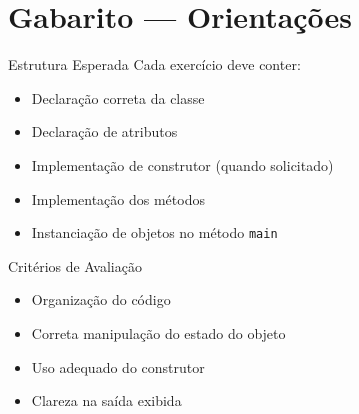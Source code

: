 \documentclass[12pt]{article}
\begin{document}

\section*{Gabarito — Orientações}

\begin{block}{Estrutura Esperada}
Cada exercício deve conter:
\begin{itemize}
    \item Declaração correta da classe
    \item Declaração de atributos
    \item Implementação de construtor (quando solicitado)
    \item Implementação dos métodos
    \item Instanciação de objetos no método \texttt{main}
\end{itemize}
\end{block}

\begin{block}{Critérios de Avaliação}
\begin{itemize}
    \item Organização do código
    \item Correta manipulação do estado do objeto
    \item Uso adequado do construtor
    \item Clareza na saída exibida
\end{itemize}
\end{block}
\end{document}
